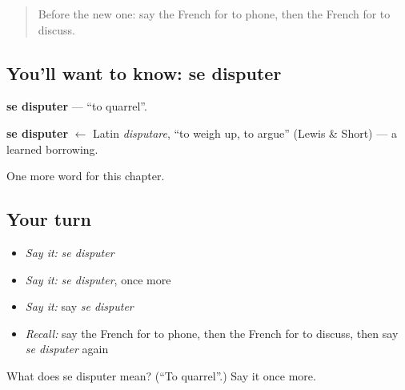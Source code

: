 \label{lesson:FR-C145-disputer}



\begin{quote}
Before the new one: say the French for to phone, then the French for to discuss.
\end{quote}

\subsection*{You'll want to know: se disputer}
\textbf{se disputer} — \textquotedblleft{}to quarrel\textquotedblright{}.

\begin{cousinweb}
\textbf{se disputer} $\leftarrow$ Latin \emph{disputare}, \textquotedblleft{}to weigh up, to argue\textquotedblright{} (Lewis \& Short) — a learned borrowing.
\end{cousinweb}

\begin{grammarlens}[title={What you've built}]
One more word for this chapter.
\end{grammarlens}

\subsection*{Your turn}
\begin{itemize}
\raggedright
  \item \emph{Say it:} \emph{se disputer}
  \item \emph{Say it:} \emph{se disputer}, once more
  \item \emph{Say it:} say \emph{se disputer}
  \item \emph{Recall:} say the French for to phone, then the French for to discuss, then say \emph{se disputer} again
\end{itemize}

\begin{tcolorbox}[breakable,colback=teal!4,colframe=teal!35!black,title={Before you move on}]
What does se disputer mean? (\textquotedblleft{}To quarrel\textquotedblright{}.) Say it once more.
\end{tcolorbox}
